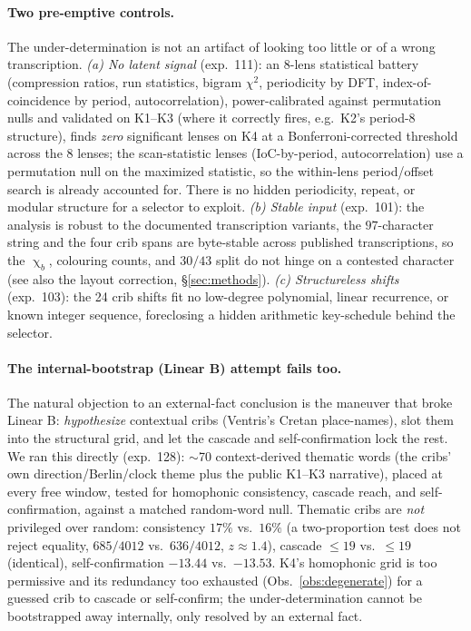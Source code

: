 \documentclass[11pt]{article}
\theoremstyle{plain}
\theoremstyle{definition}
\newcommand{\K}{\textsf{K4}}
\DeclareMathOperator{\chrom}{\chi}
\begin{document}
\paragraph{Two pre-emptive controls.} The under-determination is not an artifact of
looking too little or of a wrong transcription.
\emph{(a) No latent signal} (exp.~111): an 8-lens statistical battery (compression
ratios, run statistics, bigram $\chi^2$, periodicity by DFT, index-of-coincidence by
period, autocorrelation), power-calibrated against permutation nulls and validated on
K1--K3 (where it correctly fires, e.g.\ K2's period-8 structure), finds \emph{zero}
significant lenses on \K{} at a Bonferroni-corrected threshold across the 8 lenses;
the scan-statistic lenses (IoC-by-period, autocorrelation) use a permutation null on
the maximized statistic, so the within-lens period/offset search is already accounted
for. There is no hidden periodicity, repeat, or modular structure for a selector to
exploit.
\emph{(b) Stable input} (exp.~101): the analysis is robust to the documented
transcription variants, the $97$-character string and the four crib spans are
byte-stable across published transcriptions, so the $\chrom_b$, colouring counts, and
$30/43$ split do not hinge on a contested character (see also the layout correction,
\S\ref{sec:methods}).
\emph{(c) Structureless shifts} (exp.~103): the 24 crib shifts fit no low-degree
polynomial, linear recurrence, or known integer sequence, foreclosing a hidden
arithmetic key-schedule behind the selector.

\paragraph{The internal-bootstrap (Linear B) attempt fails too.} The natural
objection to an external-fact conclusion is the maneuver that broke Linear B:
\emph{hypothesize} contextual cribs (Ventris's Cretan place-names), slot them into
the structural grid, and let the cascade and self-confirmation lock the rest. We ran
this directly (exp.~128): $\sim$70 context-derived thematic words (the cribs' own
direction/Berlin/clock theme plus the public K1--K3 narrative), placed at every free
window, tested for homophonic consistency, cascade reach, and self-confirmation,
against a matched random-word null. Thematic cribs are \emph{not} privileged over
random: consistency $17\%$ vs.\ $16\%$ (a two-proportion test does not reject
equality, $685/4012$ vs.\ $636/4012$, $z\approx1.4$), cascade $\le19$ vs.\ $\le19$
(identical), self-confirmation $-13.44$ vs.\ $-13.53$. K4's homophonic grid is too
permissive and its redundancy too exhausted (Obs.~\ref{obs:degenerate}) for a guessed
crib to cascade or self-confirm; the under-determination cannot be bootstrapped away
internally, only resolved by an external fact.
\end{document}

